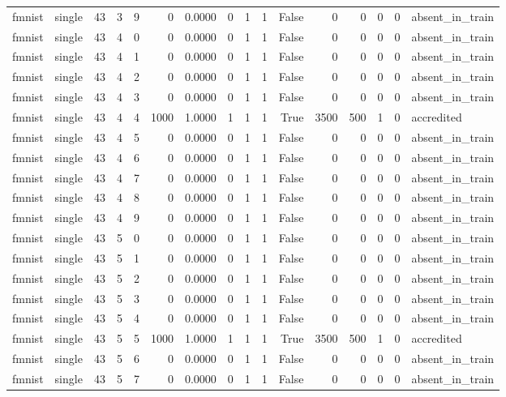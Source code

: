 \begin{tabular}{llrrrrrrrrrrrrrl}
fmnist & single & 43 & 3 & 9 & 0 & 0.0000 & 0 & 1 & 1 & False & 0 & 0 & 0 & 0 & absent\_in\_train \\
fmnist & single & 43 & 4 & 0 & 0 & 0.0000 & 0 & 1 & 1 & False & 0 & 0 & 0 & 0 & absent\_in\_train \\
fmnist & single & 43 & 4 & 1 & 0 & 0.0000 & 0 & 1 & 1 & False & 0 & 0 & 0 & 0 & absent\_in\_train \\
fmnist & single & 43 & 4 & 2 & 0 & 0.0000 & 0 & 1 & 1 & False & 0 & 0 & 0 & 0 & absent\_in\_train \\
fmnist & single & 43 & 4 & 3 & 0 & 0.0000 & 0 & 1 & 1 & False & 0 & 0 & 0 & 0 & absent\_in\_train \\
fmnist & single & 43 & 4 & 4 & 1000 & 1.0000 & 1 & 1 & 1 & True & 3500 & 500 & 1 & 0 & accredited \\
fmnist & single & 43 & 4 & 5 & 0 & 0.0000 & 0 & 1 & 1 & False & 0 & 0 & 0 & 0 & absent\_in\_train \\
fmnist & single & 43 & 4 & 6 & 0 & 0.0000 & 0 & 1 & 1 & False & 0 & 0 & 0 & 0 & absent\_in\_train \\
fmnist & single & 43 & 4 & 7 & 0 & 0.0000 & 0 & 1 & 1 & False & 0 & 0 & 0 & 0 & absent\_in\_train \\
fmnist & single & 43 & 4 & 8 & 0 & 0.0000 & 0 & 1 & 1 & False & 0 & 0 & 0 & 0 & absent\_in\_train \\
fmnist & single & 43 & 4 & 9 & 0 & 0.0000 & 0 & 1 & 1 & False & 0 & 0 & 0 & 0 & absent\_in\_train \\
fmnist & single & 43 & 5 & 0 & 0 & 0.0000 & 0 & 1 & 1 & False & 0 & 0 & 0 & 0 & absent\_in\_train \\
fmnist & single & 43 & 5 & 1 & 0 & 0.0000 & 0 & 1 & 1 & False & 0 & 0 & 0 & 0 & absent\_in\_train \\
fmnist & single & 43 & 5 & 2 & 0 & 0.0000 & 0 & 1 & 1 & False & 0 & 0 & 0 & 0 & absent\_in\_train \\
fmnist & single & 43 & 5 & 3 & 0 & 0.0000 & 0 & 1 & 1 & False & 0 & 0 & 0 & 0 & absent\_in\_train \\
fmnist & single & 43 & 5 & 4 & 0 & 0.0000 & 0 & 1 & 1 & False & 0 & 0 & 0 & 0 & absent\_in\_train \\
fmnist & single & 43 & 5 & 5 & 1000 & 1.0000 & 1 & 1 & 1 & True & 3500 & 500 & 1 & 0 & accredited \\
fmnist & single & 43 & 5 & 6 & 0 & 0.0000 & 0 & 1 & 1 & False & 0 & 0 & 0 & 0 & absent\_in\_train \\
fmnist & single & 43 & 5 & 7 & 0 & 0.0000 & 0 & 1 & 1 & False & 0 & 0 & 0 & 0 & absent\_in\_train \\

\end{tabular}
